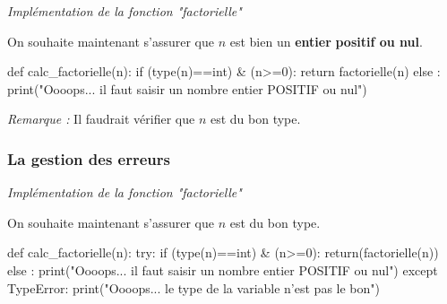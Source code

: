 \documentclass[10pt]{article}
\begin{document}
\begin{exemple}
\textit{Implémentation de la fonction "factorielle"}

On souhaite maintenant s'assurer que $n$ est bien un \textbf{entier} \textbf{positif ou nul}.



\begin{py}
\begin{python}
def calc_factorielle(n):
    if (type(n)==int) & (n>=0):
        return factorielle(n) 
    else :
        print("Oooops... il faut saisir un nombre entier POSITIF ou nul")
\end{python}
\end{py}


\textit{Remarque :} Il faudrait vérifier que $n$ est du bon type.
\end{exemple}


\subsubsection*{La gestion des erreurs}


\begin{exemple}
\textit{Implémentation de la fonction "factorielle"}

On souhaite maintenant s'assurer que $n$ est du bon type.


\begin{py}
\begin{python}[moreemph={[4], 46, 48}]
def calc_factorielle(n):
    try:
        if (type(n)==int) & (n>=0):
            return(factorielle(n))
        else :
            print("Oooops... il faut saisir un nombre entier POSITIF ou nul")
    except TypeError:
        print("Oooops... le type de la variable n'est pas le bon")
\end{python}
\end{py}


\end{exemple}
\end{document}
